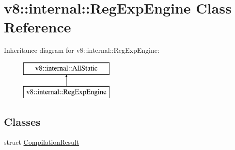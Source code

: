 \hypertarget{classv8_1_1internal_1_1_reg_exp_engine}{}\section{v8\+:\+:internal\+:\+:Reg\+Exp\+Engine Class Reference}
\label{classv8_1_1internal_1_1_reg_exp_engine}
Inheritance diagram for v8\+:\+:internal\+:\+:Reg\+Exp\+Engine\+:\begin{figure}[H]
\begin{center}
\leavevmode
\includegraphics[height=2.000000cm]{classv8_1_1internal_1_1_reg_exp_engine}
\end{center}
\end{figure}
\subsection*{Classes}
\begin{DoxyCompactItemize}
\item 
struct \hyperlink{structv8_1_1internal_1_1_reg_exp_engine_1_1_compilation_result}{Compilation\+Result}
\end{DoxyCompactItemize}

